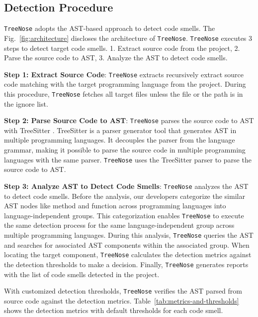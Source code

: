 
\subsection{Detection Procedure}
\label{sec:Detection Procedure}

\texttt{TreeNose} adopts the AST-based approach to detect code smells. The Fig.~\ref{fig:architecture} discloses the architecture of \texttt{TreeNose}.
\texttt{TreeNose} executes 3 steps to detect target code smells. 1. Extract source code from the project, 2. Parse the source code to AST, 3. Analyze the AST to detect code smells.


\textbf{Step 1: Extract Source Code}: \texttt{TreeNose} extracts recursively extract source code matching with the target programming language from the project. During this procedure, \texttt{TreeNose} fetches
all target files unless the file or the path is in the ignore list.

\textbf{Step 2: Parse Source Code to AST}: \texttt{TreeNose} parses the source code to AST with TreeSitter \cite{treeSitter}. 
TreeSitter is a parser generator tool that generates AST in multiple programming languages. 
It decouples the parser from the language grammar, making it possible to parse the source code in 
multiple programming languages with the same parser. \texttt{TreeNose} uses the TreeSitter parser to parse the source code 
to AST.

\textbf{Step 3: Analyze AST to Detect Code Smells}: \texttt{TreeNose} analyzes the AST to detect code smells.
Before the analysis, our developers categorize the similar AST nodes like method and function across programming 
languages into language-independent groups. This categorization enables \texttt{TreeNose} to execute the same detection process 
for the same language-independent group across multiple programming languages.
During this analysis, \texttt{TreeNose} queries the AST and searches for associated AST components within the associated group.
When locating the target component, \texttt{TreeNose} calculates the detection metrics against the detection thresholds to make a decision.
Finally, \texttt{TreeNose} generates reports with the list of code smells detected in the project.

With customized detection thresholds, \texttt{TreeNose} verifies the AST parsed from source code against the detection metrics. 
Table~\ref{tab:metrics-and-thresholds} shows the detection metrics with default thresholds for each code smell.

